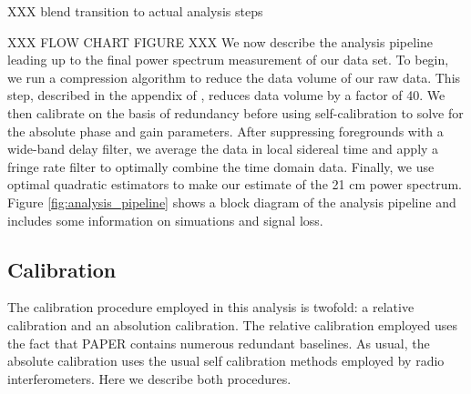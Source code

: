 \documentclass[twocolumn,numberedappendix]{emulateapj} \shorttitle{PSA64}
\begin{document}
XXX blend transition to actual analysis steps


XXX FLOW CHART FIGURE XXX
We now describe the analysis pipeline leading up to the final power spectrum
measurement of our data set. To begin, we run a compression algorithm to reduce
the data volume of our raw data. This step, described in the appendix of
\cite{parsons_et_al2014}, reduces data volume by a factor of 40. We then
calibrate on the basis of redundancy before using self-calibration
to solve for the absolute phase and gain parameters. After suppressing
foregrounds with a wide-band delay filter, we average the data in local
sidereal time and apply a fringe rate filter to optimally combine the
time domain data. Finally, we use optimal quadratic estimators to make our
estimate of the 21 cm power spectrum.  Figure \ref{fig:analysis_pipeline} shows
a block diagram of the analysis pipeline and includes some information on
simuations and signal loss.

\subsection{Calibration}\label{sec:calibration}
The calibration procedure employed in this analysis is twofold: a relative
calibration and an absolution calibration. The relative calibration employed
uses the fact that PAPER contains numerous redundant baselines. As usual, the
absolute calibration uses the usual self calibration methods employed by radio
interferometers. Here we describe both procedures.
\end{document}
